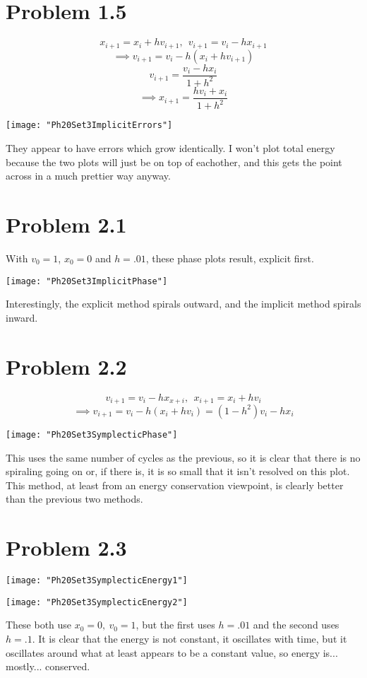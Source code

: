 \documentclass[12pt]{article}
\begin{document}
	\section*{Problem 1.5}
		\[x_{i+1} = x_i + hv_{i+1},\ \ v_{i+1} = v_i - hx_{i+1}\]
		\[\implies v_{i+1} = v_i - h\left(x_i + hv_{i+1}\right)\]
		\[v_{i+1}= \frac{v_i - hx_i}{1 + h^2} \]
		\[\implies x_{i+1} = \frac{hv_i + x_i}{1 + h^2}\]
		\begin{center}
			\texttt{[image: "Ph20Set3ImplicitErrors"]}
		\end{center}
		They appear to have errors which grow identically. I won't plot total energy because the two plots will just be on top of eachother, and this gets the point across in a much prettier way anyway. \pagebreak
	\section*{Problem 2.1}
		With $v_0 = 1$, $x_0 = 0$ and $h = .01$, these phase plots result, explicit first.
		\begin{center}
		\end{center}
		\begin{center}
			\texttt{[image: "Ph20Set3ImplicitPhase"]}
		\end{center}
		Interestingly, the explicit method spirals outward, and the implicit method spirals inward.
	\section*{Problem 2.2}
		\[v_{i+1} = v_i - hx_{x+i},\ \ x_{i+1} = x_i + h v_i\]
		\[\implies v_{i+1} = v_i - h\left(x_i + hv_i\right) = (1-h^2)v_i - hx_i\]
		\begin{center}
			\texttt{[image: "Ph20Set3SymplecticPhase"]}
		\end{center}
		This uses the same number of cycles as the previous, so it is clear that there is no spiraling going on or, if there is, it is so small that it isn't resolved on this plot. This method, at least from an energy conservation viewpoint, is clearly better than the previous two methods. \pagebreak
	\section*{Problem 2.3}
		\begin{center}
			\texttt{[image: "Ph20Set3SymplecticEnergy1"]}
		\end{center}
		\begin{center}
			\texttt{[image: "Ph20Set3SymplecticEnergy2"]}
		\end{center}
		These both use $x_0 = 0,\ v_0 = 1$, but the first uses $h = .01$ and the second uses $h = .1$. It is clear that the energy is not constant, it oscillates with time, but it oscillates around what at least appears to be a constant value, so energy is... mostly... conserved.
\end{document}
